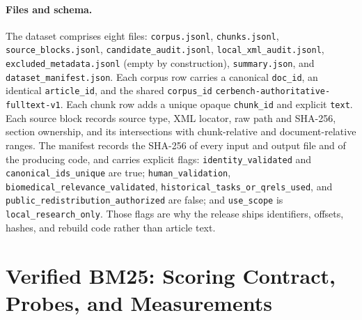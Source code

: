 \paragraph{Files and schema.}
The dataset comprises eight files: \texttt{corpus.jsonl}, \texttt{chunks.jsonl}, \texttt{source\_blocks.jsonl}, \texttt{candidate\_audit.jsonl}, \texttt{local\_xml\_audit.jsonl}, \texttt{excluded\_metadata.jsonl} (empty by construction), \texttt{summary.json}, and \texttt{dataset\_manifest.json}. Each corpus row carries a canonical \texttt{doc\_id}, an identical \texttt{article\_id}, and the shared \texttt{corpus\_id} \texttt{cerbench-authoritative-fulltext-v1}. Each chunk row adds a unique opaque \texttt{chunk\_id} and explicit \texttt{text}. Each source block records source type, XML locator, raw path and SHA-256, section ownership, and its intersections with chunk-relative and document-relative ranges. The manifest records the SHA-256 of every input and output file and of the producing code, and carries explicit flags: \texttt{identity\_validated} and \texttt{canonical\_ids\_unique} are true; \texttt{human\_validation}, \texttt{biomedical\_relevance\_validated}, \texttt{historical\_tasks\_or\_qrels\_used}, and \texttt{public\_redistribution\_authorized} are false; and \texttt{use\_scope} is \texttt{local\_research\_only}. Those flags are why the release ships identifiers, offsets, hashes, and rebuild code rather than article text.

\section{Verified BM25: Scoring Contract, Probes, and Measurements}
\label{app:bm25}
